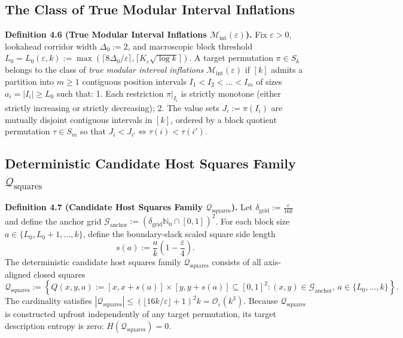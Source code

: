\documentclass[
  11pt,
]{article}
\begin{document}
\subsection{The Class of True Modular Interval
Inflations}\label{the-class-of-true-modular-interval-inflations}

\textbf{Definition 4.6 (True Modular Interval Inflations
\(\mathcal{M}_{\mathrm{int}}(\varepsilon)\)).} Fix \(\varepsilon > 0\),
lookahead corridor width \(\Delta_0 := 2\), and macroscopic block
threshold
\(L_0 = L_0(\varepsilon, k) := \max(\lceil 8\Delta_0/\varepsilon \rceil, \lceil K_\varepsilon \sqrt{\log k} \rceil)\).
A target permutation \(\pi \in S_k\) belongs to the class of \emph{true
modular interval inflations} \(\mathcal{M}_{\mathrm{int}}(\varepsilon)\)
if \([k]\) admits a partition into \(m \ge 1\) contiguous position
intervals \(I_1 < I_2 < \dots < I_m\) of sizes \(a_i = |I_i| \ge L_0\)
such that: 1. Each restriction \(\pi|_{I_i}\) is strictly monotone
(either strictly increasing or strictly decreasing); 2. The value sets
\(J_i := \pi(I_i)\) are mutually disjoint contiguous intervals in
\([k]\), ordered by a block quotient permutation \(\tau \in S_m\) so
that \(J_i < J_{i'} \iff \tau(i) < \tau(i')\).

\subsection{\texorpdfstring{Deterministic Candidate Host Squares Family
\(\mathcal{Q}_{\mathrm{squares}}\)}{Deterministic Candidate Host Squares Family \textbackslash mathcal\{Q\}\_\{\textbackslash mathrm\{squares\}\}}}\label{deterministic-candidate-host-squares-family-mathcalq_mathrmsquares}

\textbf{Definition 4.7 (Candidate Host Squares Family
\(\mathcal{Q}_{\mathrm{squares}}\)).} Let
\(\delta_{\mathrm{grid}} := \frac{\varepsilon}{16k}\) and define the
anchor grid
\(\mathcal{G}_{\mathrm{anchor}} := (\delta_{\mathrm{grid}} \mathbb{N}_0 \cap [0, 1])^2\).
For each block size \(a \in \{L_0, L_0 + 1, \dots, k\}\), define the
boundary-slack scaled square side length \[
s(a) := \frac{a}{k} \left(1 - \frac{\varepsilon}{4}\right).
\] The deterministic candidate host squares family
\(\mathcal{Q}_{\mathrm{squares}}\) consists of all axis-aligned closed
squares \[
\mathcal{Q}_{\mathrm{squares}} := \left\{ Q(x, y, a) := [x, x + s(a)] \times [y, y + s(a)] \subseteq [0, 1]^2 : (x, y) \in \mathcal{G}_{\mathrm{anchor}}, \, a \in \{L_0, \dots, k\} \right\}.
\] The cardinality satisfies
\(|\mathcal{Q}_{\mathrm{squares}}| \le (\lfloor 16k/\varepsilon \rfloor + 1)^2 k = \mathcal{O}_\varepsilon(k^3)\).
Because \(\mathcal{Q}_{\mathrm{squares}}\) is constructed upfront
independently of any target permutation, its target description entropy
is zero: \(H(\mathcal{Q}_{\mathrm{squares}}) = 0\).
\end{document}
